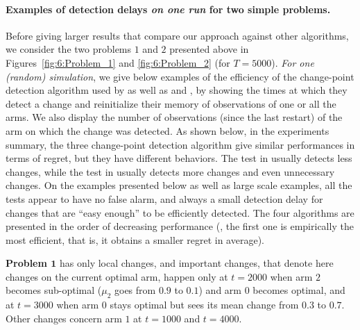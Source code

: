 \paragraph{Examples of detection delays \emph{on one run} for two simple problems.}

Before giving larger results that compare our approach against other algorithms, we consider the two problems $1$ and $2$ presented above in Figures~\ref{fig:6:Problem_1} and \ref{fig:6:Problem_2} (for $T=5000$).
\emph{For one (random) simulation}, we give below examples of the efficiency of the change-point detection algorithm used by \GLRklUCB{} as well as \CUSUMklUCB{} and \MklUCB,
by showing the times at which they detect a change and reinitialize their memory of observations of one or all the arms.
We also display the number of observations (since the last restart) of the arm on which the change was detected.
As shown below, in the experiments summary, the three change-point detection algorithm give similar performances in terms of regret, but they have different behaviors.
The test in \MUCB{} usually detects less changes, while the test in \CUSUMUCB{} usually detects more changes and even unnecessary changes.
%
On the examples presented below as well as large scale examples, all the tests appear to have no false alarm, and always a small detection delay for changes that are ``easy enough'' to be efficiently detected.
The four algorithms are presented in the order of decreasing performance (\ie, the first one is empirically the most efficient, that is, it obtains a smaller regret in average).



\textbf{Problem $\bm{1}$} has only local changes, and important changes, that denote here changes on the current optimal arm, happen only at $t=2000$ when arm $2$ becomes sub-optimal ($\mu_2$ goes from $0.9$ to $0.1$) and arm $0$ becomes optimal, and at $t=3000$ when arm $0$ stays optimal but sees its mean change from $0.3$ to $0.7$.
Other changes concern arm $1$ at $t=1000$ and $t=4000$.


